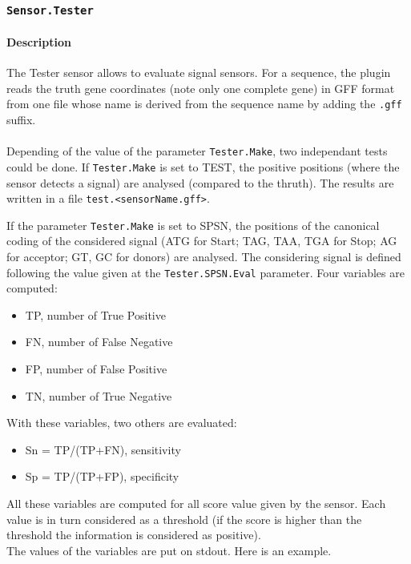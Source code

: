 
\subsubsection{\texttt{Sensor.Tester}}

\paragraph{Description}

The Tester sensor allows to evaluate signal sensors. For a sequence,
the plugin reads the truth gene coordinates (note only one complete gene) in GFF format from one file whose name
is derived from the sequence name by adding the \texttt{.gff} suffix.\\
\\
Depending of the value of the parameter \texttt{Tester.Make}, two independant tests could be done. If \texttt{Tester.Make} is set to TEST, the positive positions (where the sensor detects a signal) are analysed (compared to the thruth). The results are written in a file \texttt{test.<sensorName.gff>}. 

If the parameter \texttt{Tester.Make} is set to SPSN, the positions of the canonical coding of the considered signal (ATG for Start; TAG, TAA, TGA for Stop; AG for acceptor; GT, GC for donors) are analysed. The considering signal is defined following the value given at the \texttt{Tester.SPSN.Eval} parameter. Four variables are computed:
\begin{itemize} 
\item TP, number of True Positive
\item FN, number of False Negative
\item FP, number of False Positive
\item TN, number of True Negative
\end {itemize}
With these variables, two others are evaluated:
\begin {itemize}
\item Sn = TP/(TP+FN), sensitivity
\item Sp = TP/(TP+FP), specificity
\end {itemize}

All these variables are computed for all score value given by the sensor. Each value is in turn considered as a threshold (if the score is higher than the threshold the information is considered as positive).\\
The values of the variables are put on stdout. Here is an example.

